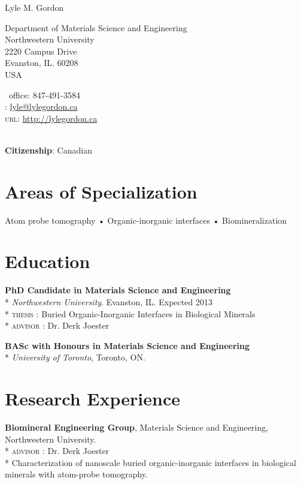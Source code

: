 \setlength\parindent{0cm}
{\LARGE Lyle M. Gordon}\\[0.5cm]

\noindent\begin{minipage}[t]{0.6\textwidth}
Department of Materials Science and Engineering\\
Northwestern University\\
2220 Campus Drive\\
Evanston, IL. 60208\\
USA
\end{minipage}%
\hfill
\begin{minipage}[t]{0.4\textwidth}
\Telefon \ {\small{office}}: 847-491-3584\\
\Letter: \href{mailto:lyle@lylegordon.ca}{lyle@lylegordon.ca}\\
\textsc{url}: \href{http://lylegordon.ca}{http://lylegordon.ca}
\end{minipage}\\

\textbf{Citizenship}: Canadian

\section*{\large{Areas of Specialization}}
Atom probe tomography • Organic-inorganic interfaces • Biomineralization

\section*{Education}
\textbf{PhD Candidate in Materials Science and Engineering}\\*
\begingroup\setlength{\parskip}{0.2cm}
\emph{Northwestern University}. Evanston, IL. Expected 2013\\*
\textsc{thesis} : Buried Organic-Inorganic Interfaces in Biological Minerals\\*
\textsc{advisor} : Dr. Derk Joester

\textbf{BASc with Honours in Materials Science and Engineering}\\*
\emph{University of Toronto}, Toronto, ON.
\endgroup

\section*{Research Experience}
\textbf{Biomineral Engineering Group}, Materials Science and Engineering, Northwestern University.\\*
\begingroup\setlength{\parskip}{0.2cm}
\textsc{advisor} : Dr. Derk Joester\\*
Characterization of nanoscale buried organic-inorganic interfaces in biological minerals with atom-probe tomography.

